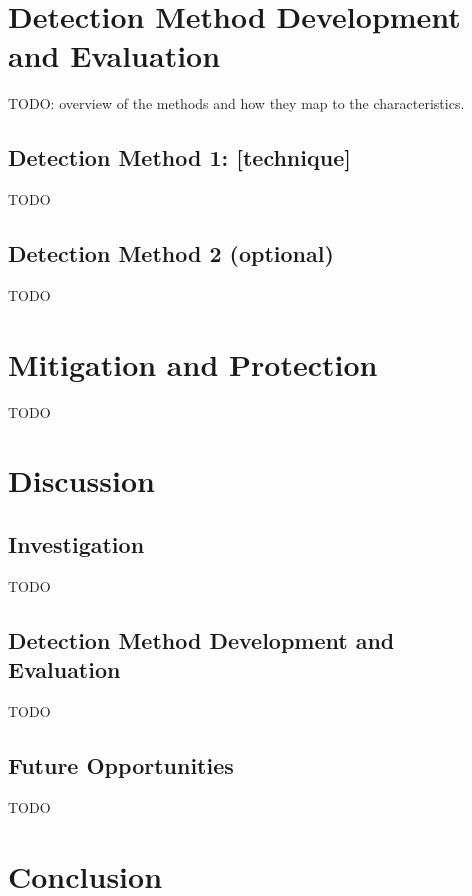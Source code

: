\documentclass[
  a4paper,
  table]{article}
\begin{document}
\section{Detection Method Development and
Evaluation}\label{sec-detection}

TODO: overview of the methods and how they map to the characteristics.

\subsection{Detection Method 1: {[}technique{]}}\label{sec-method-1}

TODO

\subsection{Detection Method 2 (optional)}\label{sec-method-2}

TODO

\section{Mitigation and Protection}\label{sec-mitigation}

TODO

\section{Discussion}\label{sec-discussion}

\subsection{Investigation}\label{investigation}

TODO

\subsection{Detection Method Development and
Evaluation}\label{detection-method-development-and-evaluation}

TODO

\subsection{Future Opportunities}\label{future-opportunities}

TODO

\section{Conclusion}\label{sec-conclusion}
\end{document}

